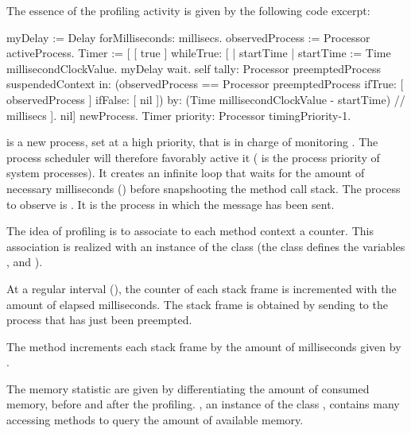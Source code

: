 \documentclass[a4paper,10pt,twoside]{book}
\begin{document}
The essence of the profiling activity is given by the following code excerpt:

\begin{code}
myDelay := Delay forMilliseconds: millisecs.
observedProcess := Processor activeProcess.
Timer := [
	[ true ] whileTrue: [
		| startTime |
		startTime := Time millisecondClockValue.
		myDelay wait.
		self
			tally: Processor preemptedProcess suspendedContext
			in: (observedProcess == Processor preemptedProcess 
					ifTrue: [ observedProcess ] ifFalse: [ nil ])
			by: (Time millisecondClockValue - startTime) // millisecs ].
	nil] newProcess.
Timer priority: Processor timingPriority-1.
\end{code}

 is a new process, set at a high priority, that is in charge of monitoring . The process scheduler will therefore favorably active it ( is the process priority of system processes). It creates an infinite loop that waits for the amount of necessary milliseconds () before snapshooting the method call stack. The process to observe is . It is the process in which the message  has been sent. 

The idea of profiling is to associate to each method context a counter. This association is realized with an instance of the class  (the class defines the variables ,  and ).

At a regular interval (), the counter of each stack frame is incremented with the amount of elapsed milliseconds. The stack frame is obtained by sending  to the process that has just been preempted.

The method  increments each stack frame by the amount of milliseconds given by .

The memory statistic are given by differentiating the amount of consumed memory, before and after the profiling. , an instance of the class , contains many accessing methods to query the amount of available memory.

\end{document}

